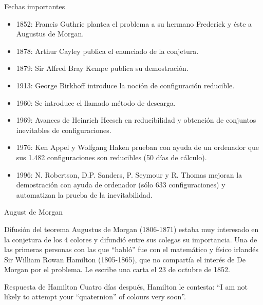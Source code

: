 \documentclass[spanish,utf8]{beamer}
\begin{document}
\begin{frame}{\insertsection}\transblindsvertical
Fechas importantes
\begin{itemize}
    \item 1852: Francis Guthrie plantea el problema a su hermano Frederick y éste a Augustus de Morgan.
    
    \item  1878: Arthur Cayley publica el enunciado de la conjetura.
    
    \item  1879: Sir Alfred Bray Kempe publica su demostración.
    
    \item  1913: George Birkhoff introduce la noción de configuración reducible.
    
    \item  1960: Se introduce el llamado método de descarga.
    
    \item  1969: Avances de Heinrich Heesch en reducibilidad y obtención de conjuntos inevitables de configuraciones.
    
    \item 1976: Ken Appel y Wolfgang Haken prueban con ayuda de un ordenador que sus 1.482 configuraciones son reducibles (50 días de cálculo).
    
    \item  1996: N. Robertson, D.P. Sanders, P. Seymour y R. Thomas mejoran la demostración con ayuda de ordenador (sólo 633 configuraciones) y automatizan la prueba de la inevitabilidad.
\end{itemize}   
\end{frame}

\begin{frame}{\insertsection}\transblindsvertical
August de Morgan
\begin{block}{Difusión del teorema}
Augustus de Morgan (1806-1871) estaba muy interesado en la conjetura de los 4 colores y difundió entre sus colegas su importancia. Una de las primeras personas con las que ``habló'' fue con el matemático y físico irlandés Sir William Rowan Hamilton (1805-1865), que no compartía el interés de De Morgan por el problema. Le escribe una carta el 23 de octubre de 1852.
\end{block}

\begin{block}{Respuesta de Hamilton}
Cuatro días después, Hamilton le contesta: ``I am not likely to attempt your “quaternion” of colours very soon''.
\end{block}    
\end{frame}
\end{document}
